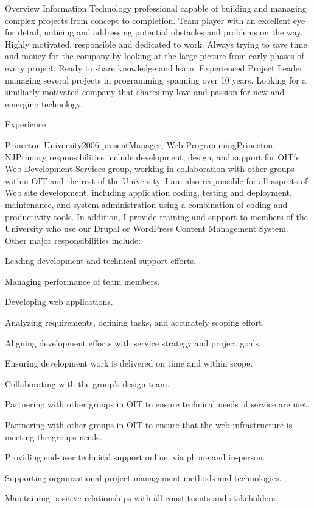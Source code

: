 \documentclass[12pt]{resume}
\begin{document}
\begin{rSection}{Overview}
Information Technology professional capable of building and managing complex projects from concept to completion. Team player with an excellent eye for detail, noticing and addressing potential obstacles and problems on the way. Highly motivated, responsible and dedicated to work. Always trying to save time and money for the company by looking at the large picture from early phases of every project. Ready to share knowledge and learn. Experienced Project Leader managing several projects in programming spanning over 10 years. Looking for a similiarly motivated company that shares my love and passion for new and emerging technology.
\end{rSection}

\begin{rSection}{Experience}

\begin{rSubsection}{Princeton University}{2006-present}{Manager, Web Programming}{Princeton, NJ}{Primary responsibilities include development, design, and support for OIT$'$s Web Development Services group, working in collaboration with other groups within OIT and the rest of the University. I am also responsible for all aspects of Web site development, including application coding, testing and deployment, maintenance, and system administration using a combination of coding and productivity tools. In addition, I provide training and support to members of the University who use our Drupal or WordPress Content Management System. Other major responsibilities include:}
\item Leading development and technical support efforts.
\item Managing performance of team members.
\item Developing web applications.
\item Analyzing requirements, defining tasks, and accurately scoping effort.
\item Aligning development efforts with service strategy and project goals.
\item Ensuring development work is delivered on time and within scope.
\item Collaborating with the group’s design team.
\item Partnering with other groups in OIT to ensure technical needs of service are met.
\item Partnering with other groups in OIT to ensure that the web infrastructure is meeting the groups needs.
\item Providing end-user technical support online, via phone and in-person.
\item Supporting organizational project management methods and technologies.
\item Maintaining positive relationships with all constituents and stakeholders.
\end{rSubsection}


\end{rSection}
\end{document}
